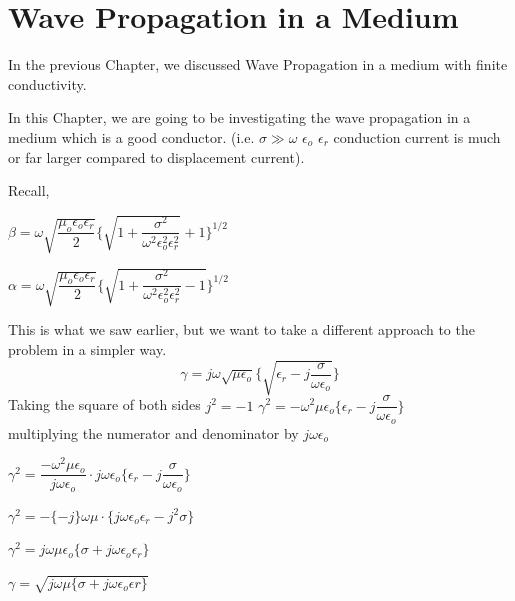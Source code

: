\chapter{Wave Propagation in a Medium}\label{lec:lec26}
In the previous Chapter, we discussed Wave Propagation in a medium with finite conductivity.

In this Chapter, we are going to be investigating the wave propagation in a medium which is a good conductor. (i.e. $\sigma \gg \omega$ $\epsilon_{o}$ $\epsilon_{r}$ conduction current is much or far larger compared to displacement current). \newline

Recall,
\begin{center}
$\beta=\omega\sqrt{\dfrac{\mu_{o}\epsilon_{o}\epsilon_{r}}{2}}\Bigg\{{\sqrt{1+\dfrac{\sigma^{2}}{\omega^{2}\epsilon_{o}^{2}\epsilon_{r}^{2}}}+1 }\Bigg\}^{1/2}$
\end{center}

\begin{center}
$\alpha=\omega\sqrt{\dfrac{\mu_{o}\epsilon_{o}\epsilon_{r}}{2}}\Bigg\{\sqrt{1+\dfrac{\sigma^{2}}{\omega^{2}\epsilon_{o}^{2}\epsilon_{r}^{2}}-1} \Bigg\}^{1/2}$	
\end{center}

This is what we saw earlier, but we want to take a different approach to the problem in a simpler way.
\begin{equation}
\gamma=j\omega\sqrt{\mu\epsilon_{o}}\Bigg\{\sqrt{\epsilon_{r}-j\dfrac{\sigma}{\omega\epsilon_{o}}}\Bigg\}
\end{equation}		
Taking the square of both sides
$j^{2}= -1$ 
$\gamma^{2}=-\omega^{2}\mu\epsilon_{o}\Bigg\{\epsilon_{r}-j\dfrac{\sigma}{\omega\epsilon_{o}}\Bigg\}$\\
multiplying the numerator and denominator by $j\omega\epsilon_{o}$

$\gamma^{2}=\dfrac{-\omega^{2}\mu\epsilon_{o}}{j\omega\epsilon_{o}}\cdot j\omega\epsilon_{o}\Bigg\{\epsilon_{r}-j\dfrac{\sigma}{\omega\epsilon_{o}}\Bigg\}$

\begin{center}
$\gamma^{2}=-\{-j\}\omega\mu\cdot\{j\omega\epsilon_{o}\epsilon_{r}-j^{2}\sigma\}$
\end{center}

\begin{center}
$\gamma^{2}=j\omega\mu\epsilon_{o}\{\sigma+j\omega\epsilon_{o}\epsilon_{r}\}$	
\end{center}

\begin{center}
$\gamma=\sqrt{j\omega\mu\{\sigma+j\omega\epsilon_{o}\epsilon{r}\}}$	
\end{center}

